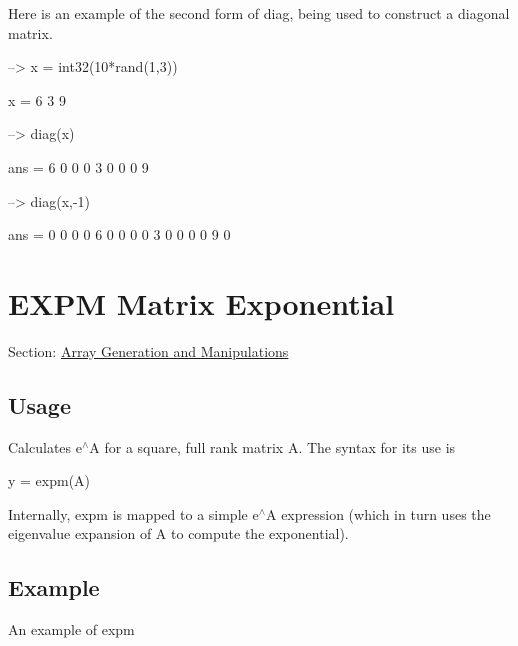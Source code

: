 Here is an example of the second form of {\ttfamily diag}, being used to construct a diagonal matrix.


\begin{DoxyVerbInclude}
--> x = int32(10*rand(1,3))

x = 
 6 3 9 

--> diag(x)

ans = 
 6 0 0 
 0 3 0 
 0 0 9 

--> diag(x,-1)

ans = 
 0 0 0 0 
 6 0 0 0 
 0 3 0 0 
 0 0 9 0 
\end{DoxyVerbInclude}
 \hypertarget{array_expm}{}\section{E\-X\-P\-M Matrix Exponential}\label{array_expm}
Section\-: \hyperlink{sec_array}{Array Generation and Manipulations} \hypertarget{vtkwidgets_vtkxyplotwidget_Usage}{}\subsection{Usage}\label{vtkwidgets_vtkxyplotwidget_Usage}
Calculates {\ttfamily e$^\wedge$\-A} for a square, full rank matrix {\ttfamily A}. The syntax for its use is \begin{DoxyVerb}   y = expm(A)
\end{DoxyVerb}
 Internally, {\ttfamily expm} is mapped to a simple {\ttfamily e$^\wedge$\-A} expression (which in turn uses the eigenvalue expansion of {\ttfamily A} to compute the exponential). \hypertarget{variables_struct_Example}{}\subsection{Example}\label{variables_struct_Example}
An example of {\ttfamily expm}


